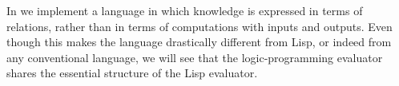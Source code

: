 In  we implement a  language in
which knowledge is expressed in terms of relations, rather than in terms of
computations with inputs and outputs.  Even though this makes the language
drastically different from Lisp, or indeed from any conventional language, we
will see that the logic-programming evaluator shares the essential structure of
the Lisp evaluator.











